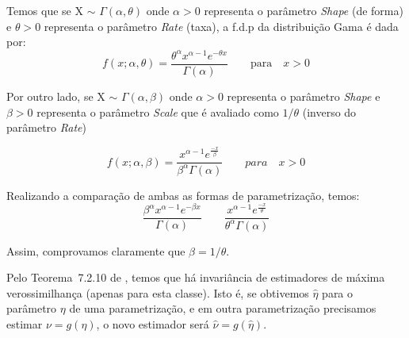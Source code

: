 Temos que se X $\sim$ \begin{math} \Gamma(\alpha, \theta) \end{math} onde \begin{math} \alpha > 0 \end{math} representa o parâmetro \textit{Shape} (de forma) e \begin{math} \theta > 0 \end{math} representa o parâmetro \textit{Rate} (taxa), a f.d.p da distribuição Gama é dada por:
\begin{equation}
f(x; \alpha, \theta )=\frac{\theta^{\alpha}x^{\alpha-1}e^{-\theta x}}{\Gamma(\alpha)} \qquad \text{para} \quad x > 0 \label{eq:fdp1}
\end{equation}

Por outro lado, se X $\sim$ \begin{math} \Gamma(\alpha, \beta) \end{math} onde \begin{math} \alpha > 0 \end{math} representa o parâmetro \textit{Shape} e \begin{math} \beta > 0 \end{math} representa o parâmetro \textit{Scale} que é avaliado como \begin{math} 1/ \theta \end{math} (inverso do parâmetro \textit{Rate})

\begin{equation}
f(x; \alpha, \beta )=\frac{x^{\alpha-1}e^{\frac{-x}{\beta}}}{\beta^{\alpha}\Gamma(\alpha)} \qquad para \quad x > 0 \label{eq:fdp2}
\end{equation}

Realizando a comparação de ambas as formas de parametrização, temos:
\begin{equation}
\frac{\beta^{\alpha}x^{\alpha-1}e^{-\beta x}}{\Gamma(\alpha)} \qquad \frac{x^{\alpha-1}e^{\frac{-x}{\theta}}}{\theta^{\alpha}\Gamma(\alpha)}
\end{equation}

Assim, comprovamos claramente que $\beta = 1/\theta$.

Pelo Teorema~7.2.10 de \citet{CasellaBergerStatisticalInference}, temos que há invariância de estimadores de máxima verossimilhança (apenas para esta classe).
Isto é, se obtivemos $\widehat{\eta}$ para o parâmetro $\eta$ de uma parametrização, e em outra parametrização precisamos estimar $\nu=g(\eta)$, o novo estimador será $\widehat{\nu}=g(\widehat{\eta})$.


